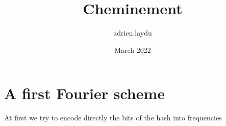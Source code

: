\documentclass{article}
\title{Cheminement}
\author{adrien.laydu }
\date{March 2022}
\begin{document}
\section{A first Fourier scheme}
At first we try to encode directly the bits of the hash into frequencies
\end{document}
